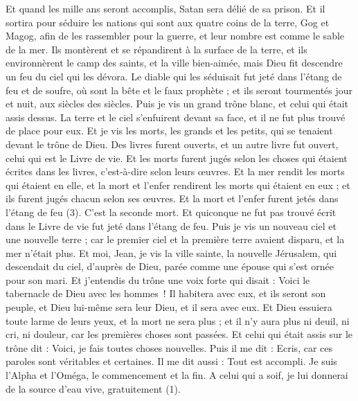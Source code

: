 \begin{multicols}{2}
Et quand les mille ans seront accomplis, Satan sera délié de sa prison.
Et il sortira pour séduire les nations qui sont aux quatre coins de la terre, Gog et Magog, afin de les rassembler pour la guerre, et leur nombre est comme le sable de la mer.
Ils montèrent et se répandirent à la surface de la terre, et ils environnèrent le camp des saints, et la ville bien-aimée, mais Dieu fit descendre un feu du ciel qui les dévora.
Le diable qui les séduisait fut jeté dans l'étang de feu et de soufre, où sont la bête et le faux prophète ; et ils seront tourmentés jour et nuit, aux siècles des siècles.
Puis je vis un grand trône blanc, et celui qui était assis dessus. La terre et le ciel s’enfuirent devant sa face, et il ne fut plus trouvé de place pour eux.
Et je vis les morts, les grands et les petits, qui se tenaient devant le trône de Dieu. Des livres furent ouverts, et un autre livre fut ouvert, celui qui est le Livre de vie. Et les morts furent jugés selon les choses qui étaient écrites dans les livres, c'est-à-dire selon leurs œuvres.
Et la mer rendit les morts qui étaient en elle, et la mort et l'enfer rendirent les morts qui étaient en eux ; et ils furent jugés chacun selon ses œuvres.
Et la mort et l'enfer furent jetés dans l'étang de feu (3). C'est la seconde mort.
Et quiconque ne fut pas trouvé écrit dans le Livre de vie fut jeté dans l'étang de feu.
\VerseOne{}Puis je vis un nouveau ciel et une nouvelle terre ; car le premier ciel et la première terre avaient disparu, et la mer n'était plus.
Et moi, Jean, je vis la ville sainte, la nouvelle Jérusalem, qui descendait du ciel, d’auprès de Dieu, parée comme une épouse qui s'est ornée pour son mari.
Et j'entendis du trône une voix forte qui disait : Voici le tabernacle de Dieu avec les hommes ! Il habitera avec eux, et ils seront son peuple, et Dieu lui-même sera leur Dieu, et il sera avec eux.
Et Dieu essuiera toute larme de leurs yeux, et la mort ne sera plus ; et il n'y aura plus ni deuil, ni cri, ni douleur, car les premières choses sont passées.
Et celui qui était assis sur le trône dit : Voici, je fais toutes choses nouvelles. Puis il me dit : Ecris, car ces paroles sont véritables et certaines.
Il me dit aussi : Tout est accompli. Je suis l'Alpha et l'Oméga, le commencement et la fin. A celui qui a soif, je lui donnerai de la source d'eau vive, gratuitement (1).

\end{multicols}
